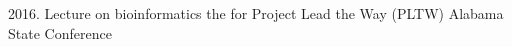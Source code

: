 \begin{tightItemize}
    \item 2016. Lecture on bioinformatics the for Project Lead the Way (PLTW)
        Alabama State Conference
\end{tightItemize}
